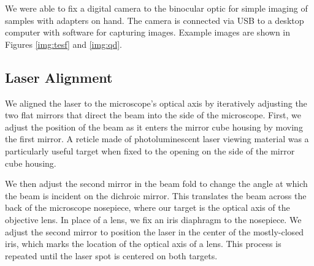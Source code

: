 We were able to fix a digital camera to the binocular optic for simple imaging of samples with adapters on hand. The camera is connected via USB to a desktop computer with software for capturing images. Example images are shown in Figures \ref{img:tesf} and \ref{img:qd}.


\subsection{Laser Alignment}
We aligned the laser to the microscope's optical axis by iteratively adjusting the two flat mirrors that direct the beam into the side of the microscope. First, we adjust the position of the beam as it enters the mirror cube housing by moving the first mirror. A reticle made of photoluminescent laser viewing material was a particularly useful target when fixed to the opening on the side of the mirror cube housing. 

We then adjust the second mirror in the beam fold to change the angle at which the beam is incident on the dichroic mirror. This translates the beam across the back of the microscope nosepiece, where our target is the optical axis of the objective lens. In place of a lens, we fix an iris diaphragm to the nosepiece. We adjust the second mirror to position the laser in the center of the mostly-closed iris, which marks the location of the optical axis of a lens. This process is repeated until the laser spot is centered on both targets.


